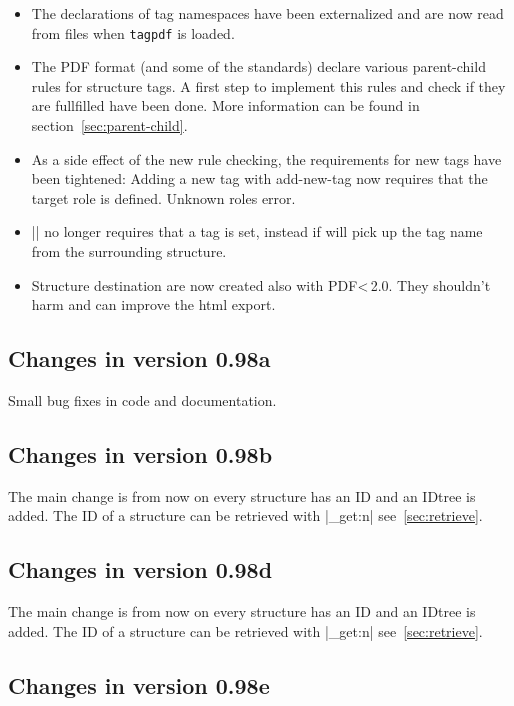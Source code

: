 \documentclass[DIV=12,parskip=half-,bibliography=totoc,a4paper]{article}
\newcommand\pkg[1]{\texttt{#1}}
\newcommand\PDF{PDF}
\begin{document}
\begin{itemize}
\item The declarations of tag namespaces have been externalized and are now
read from files when \pkg{tagpdf} is loaded. 

\item The \PDF{} format (and some of the standards) declare various parent-child rules for
structure tags. A first step to implement this rules and check if they are fullfilled have
been done. More information can be found in section~\ref{sec:parent-child}.

\item As a side effect of the new rule checking, the requirements for new tags
 have been tightened: Adding a new tag with add-new-tag now requires that the target role is 
    defined. Unknown roles error. 
    
\item |\tagmcbegin| no longer requires that a tag is set, instead if will pick up
the tag name from the surrounding structure. 

\item Structure destination are now created also with \PDF \textless\,2.0. They shouldn't harm and
can improve the html export.

\end{itemize}

\subsection{Changes in version 0.98a}
Small bug fixes in code and documentation.

\subsection{Changes in version 0.98b}
The main change is from now on every structure has an ID and an IDtree is 
added. The ID of a structure can be retrieved with |\tag_get:n| 
see~\ref{sec:retrieve}. 


\subsection{Changes in version 0.98d}
The main change is from now on every structure has an ID and an IDtree is 
added. The ID of a structure can be retrieved with |\tag_get:n| 
see~\ref{sec:retrieve}. 


\subsection{Changes in version 0.98e}
\end{document}
